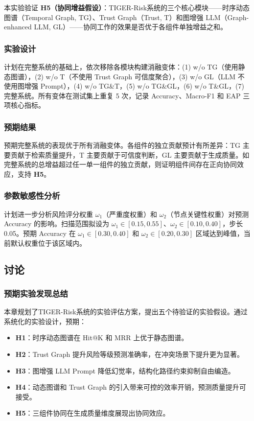 \documentclass[12pt,a4paper]{article}
\newcommand{\projectshort}{TIGER-Risk}
\begin{document}
本实验验证 \textbf{H5（协同增益假设）}：\projectshort 系统的三个核心模块——时序动态图谱（Temporal Graph, TG）、Trust Graph（Trust, T）和图增强 LLM（Graph-enhanced LLM, GL）——协同工作的效果是否优于各组件单独增益之和。

\subsubsection{实验设计}

计划在完整系统的基础上，依次移除各模块构建消融变体：(1) w/o TG（使用静态图谱），(2) w/o T（不使用 Trust Graph 可信度聚合），(3) w/o GL（LLM 不使用图增强 Prompt），(4) w/o TG\&T，(5) w/o TG\&GL，(6) w/o T\&GL，(7) 完整系统。所有变体在测试集上重复 5 次，记录 Accuracy、Macro-F1 和 EAP 三项核心指标。

\subsubsection{预期结果}

预期完整系统的表现优于所有消融变体。各组件的独立贡献预计有所差异：TG 主要贡献于检索质量提升，T 主要贡献于可信度判断，GL 主要贡献于生成质量。如完整系统的总增益超过任一单一组件的独立贡献，则证明组件间存在正向协同效应，支持 \textbf{H5}。

\subsubsection{参数敏感性分析}

计划进一步分析风险评分权重 $\omega_1$（严重度权重）和 $\omega_2$（节点关键性权重）对预测 Accuracy 的影响。扫描范围拟设为 $\omega_1 \in [0.15, 0.55]$、$\omega_2 \in [0.10, 0.40]$，步长 0.05。预期 Accuracy 在 $\omega_1 \in [0.30, 0.40]$ 和 $\omega_2 \in [0.20, 0.30]$ 区域达到峰值，当前默认权重位于该区域内。

\subsection{讨论}
\label{sec:exp-discussion}

\subsubsection{预期实验发现总结}

本章规划了\projectshort 系统的实验评估方案，提出五个待验证的实验假设。通过系统化的实验设计，预期：
\begin{itemize}
    \item \textbf{H1}：时序动态图谱在 Hit@K 和 MRR 上优于静态图谱。
    \item \textbf{H2}：Trust Graph 提升风险等级预测准确率，在冲突场景下提升更为显著。
    \item \textbf{H3}：图增强 LLM Prompt 降低幻觉率，结构化路径约束抑制自由编造。
    \item \textbf{H4}：动态图谱和 Trust Graph 的引入带来可控的效率开销，预测质量提升可接受。
    \item \textbf{H5}：三组件协同在生成质量维度展现出协同效应。
\end{itemize}
\end{document}
